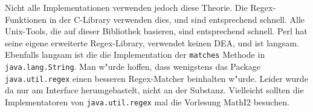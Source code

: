 \begin{sloppypar} %
Nicht alle Implementationen verwenden jedoch diese Theorie. Die
Regex-Funktionen in der C-Library verwenden dies, und sind entsprechend
schnell. Alle Unix-Tools, die auf dieser Bibliothek basieren, sind
entsprechend schnell. Perl hat seine eigene erweiterte Regex-Library,
verwendet keinen DEA, und ist langsam. Ebenfalls langsam ist die
die Implementation der {\tt matches} Methode in {\tt java.lang.String}.
Man w"urde hoffen, dass wenigstens das Package {\tt java.util.regex} einen
besseren Regex-Matcher beinhalten w"urde. Leider wurde da nur am
Interface herumgebastelt, nicht an der Substanz. Vielleicht sollten
die Implementatoren von {\tt java.util.regex} mal die Vorlesung MathI2
besuchen.
\end{sloppypar}
